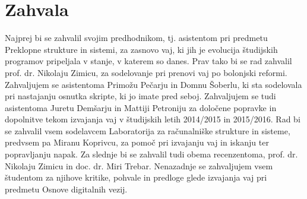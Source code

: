 \chapter*{Zahvala}

Najprej bi se zahvalil svojim predhodnikom, tj. asistentom pri predmetu Preklopne strukture in sistemi, za zasnovo vaj, ki jih je evolucija študijskih programov pripeljala v stanje, v katerem so danes. Prav tako bi se rad zahvalil prof. dr. Nikolaju Zimicu, za sodelovanje pri prenovi vaj po bolonjski reformi. Zahvaljujem se asistentoma Primožu Pečarju in Domnu Šoberlu, ki sta sodelovala pri nastajanju osnutka skripte, ki jo imate pred seboj. Zahvaljujem se tudi asistentoma Juretu Demšarju in Mattiji Petroniju za določene popravke in dopolnitve tekom izvajanja vaj v študijskih letih 2014/2015 in 2015/2016. Rad bi se zahvalil vsem sodelavcem Laboratorija za računalniške strukture in sisteme, predvsem pa Miranu Koprivcu, za pomoč pri izvajanju vaj in iskanju ter popravljanju napak. Za slednje bi se zahvalil tudi obema recenzentoma, prof. dr. Nikolaju Zimicu in doc. dr. Miri Trebar. Nenazadnje se zahvaljujem vsem študentom za njihove kritike, pohvale in predloge glede izvajanja vaj pri predmetu Osnove digitalnih vezij.


